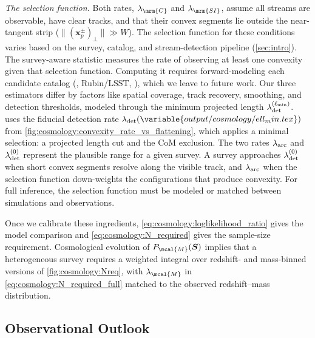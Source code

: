 \documentclass[linenumbers,twocolumn]{aastex701}
\renewcommand{\mbf}[1]{\boldsymbol{#1}}
\newcommand{\rubinlsst}{\gls{Rubin}/\gls{LSST}}
\newcommand{\xvec}{\mbf{x}}  %
\newcommand{\proj}[1]{{#1}_{p}}  %
\newcommand{\xsky}{\proj{\xvec}}  %
\newcommand{\lamM}{\ensuremath{\lambda_{\mcal{M}}}}   %
\newcommand{\lamC}{\ensuremath{\lambda_{\mrm{C}}}}    %
\newcommand{\lamSI}{\ensuremath{\lambda_{\mrm{SI}}}}  %
\newcommand{\lamdadet}[1]{\ensuremath{\lambda_{\rm det}^{({#1})}}}
\begin{document}
        \emph{The selection function.} %
            Both rates, $\lamC$ and $\lamSI$, assume all streams are observable, have clear tracks, and that their convex segments lie outside the near-tangent strip ($\|(\xsky^{\pm})_{\perp}\|\gg W$). %
            The selection function for these conditions varies based on the survey, catalog, and stream-detection pipeline (\autoref{sec:intro}). %
            The survey-aware statistic measures the rate of observing at least one convexity given that selection function.  %
            Computing it requires forward-modeling each candidate catalog (\gaia, \rubinlsst{}, \euclid{}), which we leave to future work. %
            Our three estimators differ by factors like spatial coverage, track recovery, smoothing, and detection thresholds, modeled through the minimum projected length $\lamdadet{\ell_{\min}}$. %
             uses the fiducial detection rate $\lambda_{\rm det}(\variable{output/cosmology/ell_min.tex})$ from \cref{fig:cosmology:convexity_rate_vs_flattening}, which applies a minimal selection: a projected length cut and the  \gls{CoM} exclusion.  %
            The two rates $\lambda_{\rm arc}$ and $\lamdadet{0}$ represent the plausible range for a given survey. %
            A survey approaches $\lamdadet{0}$ when short convex segments resolve along the visible track, and $\lambda_{\rm arc}$ when the selection function down-weights the configurations that produce convexity. %
            For full inference, the selection function must be modeled or matched between simulations and observations. %

        Once we calibrate these ingredients, \cref{eq:cosmology:loglikelihood_ratio} gives the model comparison and \cref{eq:cosmology:N_required} gives the sample-size requirement. %
        Cosmological evolution of $P_{\mcal{M}}(\mbf{S})$ implies that a heterogeneous survey requires a weighted integral over redshift- and mass-binned versions of \cref{fig:cosmology:Nreq}, with $\lamM$ in \cref{eq:cosmology:N_required_full} matched to the observed redshift--mass distribution. %


    \subsection{Observational Outlook}\label{sec:discussion:outlook}
\end{document}
